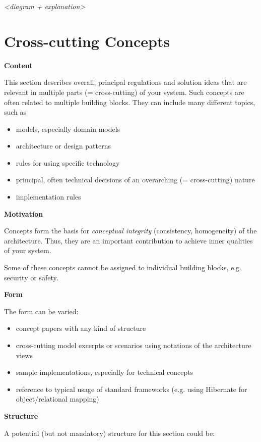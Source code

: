 \documentclass[
]{article}
\begin{document}
\emph{\textless diagram + explanation\textgreater{}}

\hypertarget{section-concepts}{%
\section{Cross-cutting Concepts}\label{section-concepts}}

\textbf{Content}

This section describes overall, principal regulations and solution ideas
that are relevant in multiple parts (= cross-cutting) of your system.
Such concepts are often related to multiple building blocks. They can
include many different topics, such as

\begin{itemize}
\item
  models, especially domain models
\item
  architecture or design patterns
\item
  rules for using specific technology
\item
  principal, often technical decisions of an overarching (=
  cross-cutting) nature
\item
  implementation rules
\end{itemize}

\textbf{Motivation}

Concepts form the basis for \emph{conceptual integrity} (consistency,
homogeneity) of the architecture. Thus, they are an important
contribution to achieve inner qualities of your system.

Some of these concepts cannot be assigned to individual building blocks,
e.g. security or safety.

\textbf{Form}

The form can be varied:

\begin{itemize}
\item
  concept papers with any kind of structure
\item
  cross-cutting model excerpts or scenarios using notations of the
  architecture views
\item
  sample implementations, especially for technical concepts
\item
  reference to typical usage of standard frameworks (e.g. using
  Hibernate for object/relational mapping)
\end{itemize}

\textbf{Structure}

A potential (but not mandatory) structure for this section could be:
\end{document}

